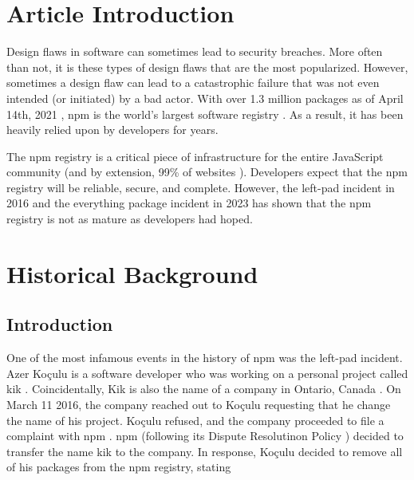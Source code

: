 \documentclass[acmsmall]{acmart}
\begin{document}

\maketitle

\fancyfoot{}
\thispagestyle{empty}

\section{Article Introduction}
Design flaws in software can sometimes lead to security breaches. More often
than not, it is these types of design flaws that are the most popularized.
However, sometimes a design flaw can lead to a catastrophic failure that was not
even intended (or initiated) by a bad actor. With over 1.3 million packages as
of April 14th, 2021 \cite{npmblog-stats}, npm is the world's largest software
registry \cite{aboutnpm,w3schools}. As a result, it has been heavily relied upon
by developers for years.

The npm registry is a critical piece of infrastructure for the entire JavaScript
community (and by extension, 99\% of websites \cite{w3techs}). Developers expect
that the npm registry will be reliable, secure, and complete. However, the
left-pad incident in 2016 \cite{npmblog-leftpad} and the everything package
incident in 2023 \cite{youtube-everything} has shown that the npm registry is
not as mature as developers had hoped.

\section{Historical Background}
\subsection{Introduction}
One of the most infamous events in the history of npm was the left-pad incident.
Azer Koçulu is a software developer who was working on a personal project called
kik \cite{qz}. Coincidentally, Kik is also the name of a company in Ontario,
Canada \cite{qz, crunchbase}. On March 11 2016, the company reached out to
Koçulu requesting that he change the name of his project. Koçulu refused, and
the company proceeded to file a complaint with npm \cite{qz}. npm (following its
Dispute Resolutinon Policy \cite{npm-dispute-policy}) decided to transfer the
name kik to the company. In response, Koçulu decided to remove all of his
packages from the npm registry, stating
\end{document}
